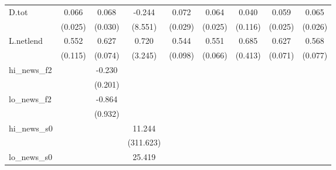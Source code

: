 {\begin{tabular}{l*{8}{c}}
\addlinespace
D.tot       &       0.066\sym{***}&       0.068\sym{**} &      -0.244         &       0.072\sym{**} &       0.064\sym{***}&       0.040         &       0.059\sym{**} &       0.065\sym{**} \\
            &     (0.025)         &     (0.030)         &     (8.551)         &     (0.029)         &     (0.025)         &     (0.116)         &     (0.025)         &     (0.026)         \\
\addlinespace
L.netlend   &       0.552\sym{***}&       0.627\sym{***}&       0.720         &       0.544\sym{***}&       0.551\sym{***}&       0.685\sym{*}  &       0.627\sym{***}&       0.568\sym{***}\\
            &     (0.115)         &     (0.074)         &     (3.245)         &     (0.098)         &     (0.066)         &     (0.413)         &     (0.071)         &     (0.077)         \\
\addlinespace
hi\_news\_f2  &                     &      -0.230         &                     &                     &                     &                     &                     &                     \\
            &                     &     (0.201)         &                     &                     &                     &                     &                     &                     \\
\addlinespace
lo\_news\_f2  &                     &      -0.864         &                     &                     &                     &                     &                     &                     \\
            &                     &     (0.932)         &                     &                     &                     &                     &                     &                     \\
\addlinespace
hi\_news\_s0  &                     &                     &      11.244         &                     &                     &                     &                     &                     \\
            &                     &                     &   (311.623)         &                     &                     &                     &                     &                     \\
\addlinespace
lo\_news\_s0  &                     &                     &      25.419         &                     &                     &                     &                     &                     \\

\end{tabular}}

